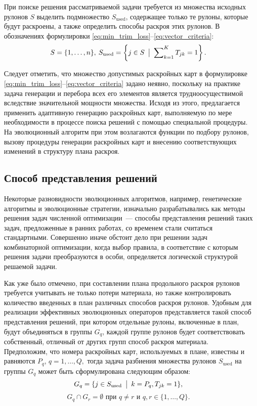 \documentclass[12pt]{article}
\begin{document}
При поиске решения рассматриваемой задачи требуется из множества исходных 
рулонов $S$ выделить подмножество $S_{\text{used}}$, содержащее только те 
рулоны, которые будут раскроены, а также определить способы раскроя этих 
рулонов. В обозначениях формулировки 
\eqref{eq:min_trim_loss}--\eqref{eq:vector_criteria}:
\[ S=\{1,\ldots,n\},\: 
   S_{\text{used}}=\left\{ j \in S \: \bigm| \: \sum\nolimits_{k=1}^{K} T_{jk}=1 \right\}. \]

Следует отметить, что множество допустимых раскройных карт в формулировке 
\eqref{eq:min_trim_loss}--\eqref{eq:vector_criteria} 
задано неявно, поскольку на практике задача генерации и перебора всех 
его элементов является трудноосуществимой вследствие значительной мощности 
множества. Исходя из этого, предлагается применить адаптивную генерацию 
раскройных карт, выполняемую по мере необходимости в процессе поиска решений 
с помощью специальной процедуры. На эволюционный алгоритм при этом возлагаются 
функции по подбору рулонов, вызову процедуры генерации раскройных карт и 
внесению соответствующих изменений в структуру плана раскроя.

\subsection{Способ представления решений}

Некоторые разновидности эволюционных алгоритмов, например, генетические
алгоритмы и эволюционные стратегии, изначально разрабатывались как методы 
решения задач численной оптимизации~--- способы представления решений таких 
задач, предложенные в ранних работах, со временем стали считаться стандартными. 
Совершенно иначе обстоит дело при решении задач комбинаторной оптимизации, 
когда выбор правила, в соответствие с которым решения задачи преобразуются в 
особи, определяется логической структурой решаемой задачи.

Как уже было отмечено, при составлении плана продольного раскроя рулонов 
требуется учитывать не только потери материала, но также контролировать 
количество введенных в план различных способов раскроя рулонов. Удобным для 
реализации эффективных эволюционных операторов представляется такой способ 
представления решений, при котором отдельные рулоны, включенные в план, 
будут объединяться в группы $G_q$, каждой группе рулонов будет соответствовать 
собственный, отличный от других групп способ раскроя материала. Предположим, 
что номера раскройных карт, используемых в плане, известны и равняются $P_q$, 
$q=1,\ldots,Q,$ тогда задача разбиения множества рулонов $S_{\text{used}}$ 
на группы $G_q$ может быть сформулирована следующим образом:
\[ G_q=\{ j \in S_{\text{used}} \: \bigm| \: k=P_q,T_{jk}=1 \}, \]
\[ G_q \cap G_r=\emptyset \text{ при } q \neq r \text{ и } q,r \in \{1,\ldots,Q\}. \]
\end{document}
